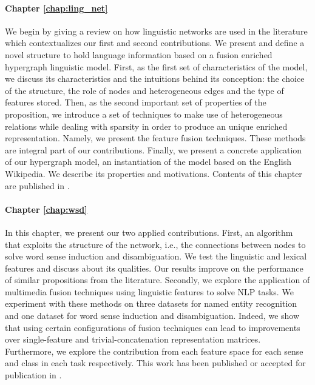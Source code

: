 \paragraph{Chapter \ref{chap:ling_net}} We begin by giving a review on how linguistic networks are used in the literature which contextualizes our first and second contributions. We present and define a novel structure to hold language information based on a fusion enriched hypergraph linguistic model.  First, as the first set of characteristics of the model, we discuss its characteristics and the intuitions behind its conception: the choice of the structure, the role of nodes and heterogeneous edges and the type of features stored.  Then, as the second important set of properties of the proposition, we introduce a set of techniques to make use of heterogeneous relations while dealing with sparsity in order to produce an unique enriched representation. Namely, we present the feature fusion techniques. These methods are integral part of our contributions. Finally, we present a concrete application of our hypergraph model, an instantiation of the model based on the English Wikipedia. We describe its properties and motivations. Contents of this chapter are published in \cite{sorianoJournal,sorianoLREC,sorianoEGCChallenge}.

\paragraph{Chapter \ref{chap:wsd}} In this chapter, we present our two applied contributions. First, an algorithm that exploits the structure of the network, i.e., the connections between nodes to solve word sense induction and disambiguation. 
We test the linguistic and lexical features and discuss about its qualities. Our results improve on the performance of similar propositions from the literature.
Secondly, we explore the application of multimedia fusion techniques using linguistic features to solve NLP tasks. 
We experiment with these methods on three datasets for named entity recognition and one dataset for word sense induction and disambiguation. Indeed, we show that using certain configurations of fusion techniques can lead to improvements over single-feature and trivial-concatenation representation matrices. Furthermore, we explore the contribution from each feature space for each sense and class in each task respectively. This work has been published or accepted for publication in \cite{sorianoCICLING,sorianoDS}.	

